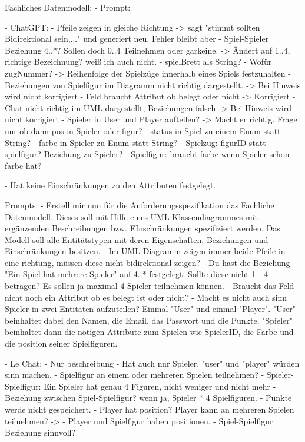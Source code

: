 Fachliches Datenmodell:
- Prompt:

- ChatGPT: 
    - Pfeile zeigen in gleiche Richtung -> sagt "stimmt sollten Bidirektional sein,..." und generiert neu. Fehler bleibt aber
    - Spiel-Spieler Beziehung 4..*? Sollen doch 0..4 Teilnehmen oder garkeine. -> Ändert auf 1..4, richtige Bezeichnung? weiß ich auch nicht.
    - spielBrett als String?
    - Wofür zugNummer? -> Reihenfolge der Spielzüge innerhalb eines Spiels festzuhalten
    - Beziehungen von Spielfigur im Diagramm nicht richtig dargestellt. -> Bei Hinweis wird nicht korrigiert
    - Feld braucht Attribut ob belegt oder nicht -> Korrigiert
    - Chat nicht richtig im UML dargestellt, Beziehungen falsch -> Bei Hinweis wird nicht korrigiert
    - Spieler in User und Player aufteilen? -> Macht er richtig. Frage nur ob dann pos in Spieler oder figur?
    - status in Spiel zu einem Enum statt String?
    - farbe in Spieler zu Enum statt String?
    - Spielzug: figurID statt spielfigur? Beziehung zu Spieler?
    - Spielfigur: braucht farbe wenn Spieler schon farbe hat?
    -

    - Hat keine Einschränkungen zu den Attributen festgelegt.

    Prompts:
        - Erstell mir nun für die Anforderungsspezifikation das Fachliche Datenmodell. Dieses soll mit Hilfe eines UML Klassendiagrammes mit ergänzenden Beschreibungen bzw. EInschränkungen spezifiziert werden. Das Modell soll alle Entitätstypen mit deren Eigenschaften, Beziehungen und Einschränkungen besitzen.
        - Im UML-Diagramm zeigen immer beide Pfeile in eine richtung, müssen diese nicht bidirektional zeigen?
        - Du hast die Beziehung "Ein Spiel hat mehrere Spieler" auf 4..* festgelegt. Sollte diese nicht 1 - 4 betragen? Es sollen ja maximal 4 Spieler teilnehmen können.
        - Braucht das Feld nicht noch ein Attribut ob es belegt ist oder nicht?
        - Macht es nicht auch sinn Spieler in zwei Entitäten aufzuteilen? Einmal "User" und einmal "Player".  "User" beinhaltet dabei den Namen, die Email, das Passwort und die Punkte. "Spieler" beinhaltet dann die nötigen Attribute zum Spielen wie SpielerID, die Farbe und die position seiner Spielfiguren.

- Le Chat:
    - Nur beschreibung
    - Hat auch nur Spieler, "user" und "player" würden sinn machen.
    - Spielfigur an einem oder mehreren Spielen teilnehmen?
    - Spieler-Spielfigur: Ein Spieler hat genau 4 Figuren, nicht weniger und nicht mehr
    - Beziehung zwischen Spiel-Spielfigur? wenn ja, Spieler * 4 Spielfiguren.
    - Punkte werde nicht gespeichert.
    - Player hat position? Player kann an mehreren Spielen teilnehmen? -> 
    - Player und Spielfigur haben positionen.
    - Spiel-Spielfigur Beziehung sinnvoll?

